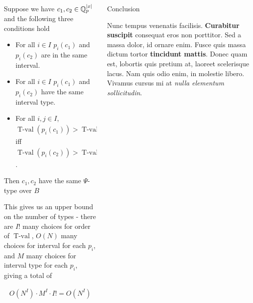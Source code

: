 \documentclass[final]{beamer}
\DeclareMathOperator{\tval}{T-val}
\newlength{\sepwid}
\newlength{\twocolwid}
\begin{document}
\begin{frame}[t]
\begin{columns}[t]
\begin{column}{\twocolwid}
\begin{Lemma}
        Suppose we have $c_1, c_2 \in \mathbb{Q}_p^{|x|}$ and the following three conditions hold
        \begin{itemize}
            \item For all $i \in I$ $p_i(c_1)$ and $p_i(c_2)$ are in the same interval.
            \item For all $i \in I$ $p_i(c_1)$ and $p_i(c_2)$ have the same interval type.
            \item For all $i,j \in I$, $\tval(p_i(c_1)) > \tval(p_j(c_1))$ iff $\tval(p_i(c_2)) > \tval(p_j(c_2))$.
        \end{itemize}
	Then $c_1, c_2$ have the same $\Psi$-type over $B$
\end{Lemma}

This gives us an upper bound on the number of types - there are $I!$ many choices for order of $\tval$,
$O(N)$ many choices for interval for each $p_i$,
and $M$ many choices for interval type for each $p_i$,
giving a total of

\begin{align*}
    O(N^I) \cdot M^I \cdot I! = O(N^I)    
\end{align*}  
	
\end{column} %


\begin{column}{\twocolwid} %


\begin{block}{Conclusion}

Nunc tempus venenatis facilisis. \textbf{Curabitur suscipit} consequat eros non porttitor. Sed a massa dolor, id ornare enim. Fusce quis massa dictum tortor \textbf{tincidunt mattis}. Donec quam est, lobortis quis pretium at, laoreet scelerisque lacus. Nam quis odio enim, in molestie libero. Vivamus cursus mi at \textit{nulla elementum sollicitudin}.

\end{block}



\end{column}
\end{columns}
\end{frame}
\end{document}
